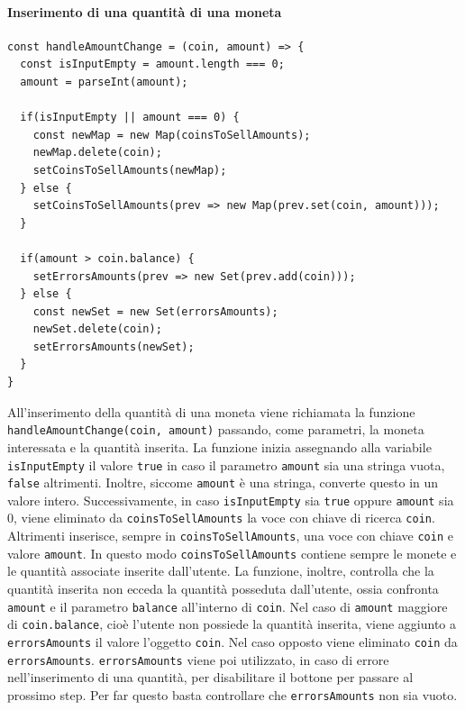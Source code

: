 \documentclass[a4paper]{article}
\begin{document}
        \paragraph{Inserimento di una quantità di una moneta}
        \label{insertCoinsToSell}
        \begin{lstlisting}[style=ES6, title={Funzione handleAmountChange}]
const handleAmountChange = (coin, amount) => {
  const isInputEmpty = amount.length === 0;
  amount = parseInt(amount);

  if(isInputEmpty || amount === 0) {
    const newMap = new Map(coinsToSellAmounts);
    newMap.delete(coin);
    setCoinsToSellAmounts(newMap);
  } else {
    setCoinsToSellAmounts(prev => new Map(prev.set(coin, amount)));
  }

  if(amount > coin.balance) {
    setErrorsAmounts(prev => new Set(prev.add(coin)));
  } else {
    const newSet = new Set(errorsAmounts);
    newSet.delete(coin);
    setErrorsAmounts(newSet);
  }
}\end{lstlisting}
        All'inserimento della quantità di una moneta viene richiamata la funzione \verb|handleAmountChange(coin, amount)| passando, come parametri, la moneta interessata e la quantità inserita.
        \newline
        La funzione inizia assegnando alla variabile \verb|isInputEmpty| il valore \verb|true| in caso il parametro \verb|amount| sia una stringa vuota, \verb|false| altrimenti. Inoltre, siccome \verb|amount| è una stringa, converte questo in un valore intero.
        \newline
        Successivamente, in caso \verb|isInputEmpty| sia \verb|true| oppure \verb|amount| sia 0, viene eliminato da \verb|coinsToSellAmounts| la voce con chiave di ricerca \verb|coin|. Altrimenti inserisce, sempre in \verb|coinsToSellAmounts|, una voce con chiave \verb|coin| e valore \verb|amount|.
        In questo modo \verb|coinsToSellAmounts| contiene sempre le monete e le quantità associate inserite dall'utente.
        \newline
        La funzione, inoltre, controlla che la quantità inserita non ecceda la quantità posseduta dall'utente, ossia confronta \verb|amount| e il parametro \verb|balance| all'interno di \verb|coin|.
        \newline
        Nel caso di \verb|amount| maggiore di \verb|coin.balance|, cioè l'utente non possiede la quantità inserita, viene aggiunto a \verb|errorsAmounts| il valore l'oggetto \verb|coin|.
        Nel caso opposto viene eliminato \verb|coin| da \verb|errorsAmounts|. \verb|errorsAmounts| viene poi utilizzato, in caso di errore nell'inserimento di una quantità, per disabilitare il bottone per passare al prossimo step.
        Per far questo basta controllare che \verb|errorsAmounts| non sia vuoto.
\end{document}

